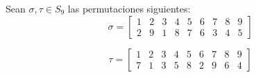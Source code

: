 \question
Sean $\sigma,\tau \in S_9$ las permutaciones siguientes:\\

\begin{equation}
\sigma = 
\begin{bmatrix} 
1 & 2 & 3 & 4 & 5 & 6 & 7 & 8 & 9 \\
2 & 9 & 1 & 8 & 7 & 6 & 3 & 4 & 5
\end{bmatrix}
\end{equation}

\begin{equation}
\tau = 
\begin{bmatrix} 
1 & 2 & 3 & 4 & 5 & 6 & 7 & 8 & 9 \\
7 & 1 & 3 & 5 & 8 & 2 & 9 & 6 & 4
\end{bmatrix}
\end{equation}

